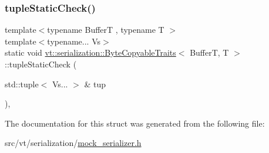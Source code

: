 \mbox{\label{structvt_1_1serialization_1_1_byte_copyable_traits_aaad683f9cdcd56e768a19864c22d1020}} 
\subsubsection{\texorpdfstring{tuple\+Static\+Check()}{tupleStaticCheck()}}
{\footnotesize\ttfamily template$<$typename BufferT , typename T $>$ \\
template$<$typename... Vs$>$ \\
static void \hyperlink{structvt_1_1serialization_1_1_byte_copyable_traits}{vt\+::serialization\+::\+Byte\+Copyable\+Traits}$<$ BufferT, T $>$\+::tuple\+Static\+Check (\begin{DoxyParamCaption}\item[{std\+::tuple$<$ Vs... $>$ \&}]{tup }\end{DoxyParamCaption})\hspace{0.3cm}{\ttfamily [inline]}, {\ttfamily [static]}}



The documentation for this struct was generated from the following file\+:\begin{DoxyCompactItemize}
\item 
src/vt/serialization/\hyperlink{mock__serializer_8h}{mock\+\_\+serializer.\+h}\end{DoxyCompactItemize}
